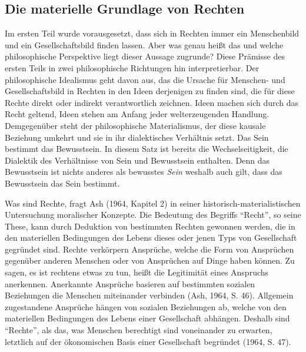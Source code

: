 \documentclass[ngerman,12pt, titlepage, smallheadings, nomath]{scrartcl}
\begin{document}
\subsection{Die materielle Grundlage von
Rechten}\label{die-materielle-grundlage-von-rechten}

Im ersten Teil wurde vorausgesetzt, dass sich in Rechten immer ein
Menschenbild und ein Gesellschaftsbild finden lassen. Aber was genau
heißt das und welche philosophische Perspektive liegt dieser Aussage
zugrunde? Diese Prämisse des ersten Teils in zwei philosophische
Richtungen hin interpretierbar. Der philosophische Idealismus geht davon
aus, das die Ursache für Menschen- und Gesellschaftsbild in Rechten in
den Ideen derjenigen zu finden sind, die für diese Rechte direkt oder
indirekt verantwortlich zeichnen. Ideen machen sich durch das Recht
geltend, Ideen stehen am Anfang jeder welterzeugenden Handlung.
Demgegenüber steht der philosophische Materialismus, der diese kausale
Beziehung umkehrt und sie in ihr dialektisches Verhältnis setzt. Das
Sein bestimmt das Bewusstsein. In diesem Satz ist bereits die
Wechselseitigkeit, die Dialektik des Verhältnisse von Sein und
Bewusstsein enthalten. Denn das Bewusstsein ist nichts anderes als
bewusstes \emph{Sein} weshalb auch gilt, dass das Bewusstsein das Sein
bestimmt.

Was sind Rechte, fragt Ash (1964, Kapitel 2) in seiner
historisch-materialistischen Untersuchung moralischer Konzepte. Die
Bedeutung des Begriffs \enquote{Recht}, so seine These, kann durch
Deduktion von bestimmten Rechten gewonnen werden, die in den materiellen
Bedingungen des Lebens dieses oder jenen Typs von Gesellschaft gegründet
sind. Rechte verkörpern Ansprüche, welche die Form von Ansprüchen
gegenüber anderen Menschen oder von Ansprüchen auf Dinge haben können.
Zu sagen, es ist rechtens etwas zu tun, heißt die Legitimität eines
Anspruchs anerkennen. Anerkannte Ansprüche basieren auf bestimmten
sozialen Beziehungen die Menschen miteinander verbinden (Ash, 1964, S.
46). Allgemein zugestandene Ansprüche hängen von sozialen Beziehungen
ab, welche von den materiellen Bedingungen des Lebens einer Gesellschaft
abhängen. Deshalb sind \enquote{Rechte}, als das, was Menschen
berechtigt sind voneinander zu erwarten, letztlich auf der ökonomischen
Basis einer Gesellschaft begründet (1964, S. 47).
\end{document}
